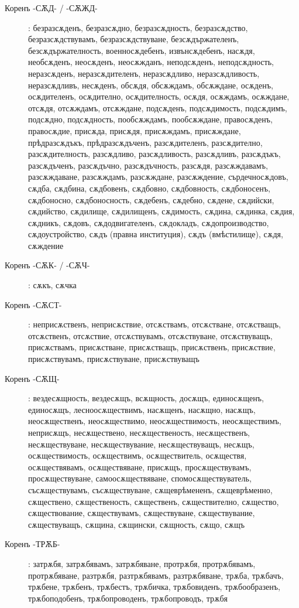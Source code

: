 \documentclass{article}
\begin{document}
\begin{description}
		\item[Коренъ -СѪД- / -СѪЖД-]: безразсѫденъ, безразсѫдно, безразсѫдность, безразсѫдство, безразсѫдствувамъ, безразсѫдствуване, безсѫдържателенъ, безсѫдържателность, военносѫдебенъ, извънсѫдебенъ, насѫдя, необсѫденъ, неосѫденъ, неосѫжданъ, неподсѫденъ, неподсѫдность, неразсѫденъ, неразсѫдителенъ, неразсѫдливо, неразсѫдливость, неразсѫдливъ, несѫденъ, обсѫдя, обсѫждамъ, обсѫждане, осѫденъ, осѫдителенъ, осѫдително, осѫдителность, осѫдя, осѫждамъ, осѫждане, отсѫдя, отсѫждамъ, отсѫждане, подсѫденъ, подсѫдимость, подсѫдимъ, подсѫдно, подсѫдность, пообсѫждамъ, пообсѫждане, правосѫденъ, правосѫдие, присѫда, присѫдя, присѫждамъ, присѫждане, прѣдразсѫдъкъ, прѣдразсѫдъченъ, разсѫдителенъ, разсѫдително, разсѫдителность, разсѫдливо, разсѫдливость, разсѫдливъ, разсѫдъкъ, разсѫдъченъ, разсѫдъчно, разсѫдъчность, разсѫдя, разсѫждавамъ, разсѫждаване, разсѫждамъ, разсѫждане, разсѫждение, сърдечносѫдовъ, сѫдба, сѫдбина, сѫдбовенъ, сѫдбовно, сѫдбовность, сѫдбоносенъ, сѫдбоносно, сѫдбоносность, сѫдебенъ, сѫдебно, сѫдене, сѫдийски, сѫдийство, сѫдилище, сѫдилищенъ, сѫдимость, сѫдина, сѫдинка, сѫдия, сѫдникъ, сѫдовъ, сѫдодвигателенъ, сѫдокладъ, сѫдопроизводство, сѫдоустройство, сѫдъ (правна институция), сѫдъ (вмѣстилище), сѫдя, сѫждение
		
		\item[Коренъ -СѪК- / -СѪЧ-]: сѫкъ, сѫчка
		
		\item[Коренъ -СѪСТ-]: неприсѫственъ, неприсѫствие, отсѫствамъ, отсѫстване, отсѫстващъ, отсѫственъ, отсѫствие, отсѫствувамъ, отсѫствуване, отсѫствуващъ, присѫствамъ, присѫстване, присѫстващъ, присѫственъ, присѫствие, присѫствувамъ, присѫствуване, присѫствуващъ
		
		\item[Коренъ -СѪЩ-]: вездесѫщность, вездесѫщъ, всѫщность, досѫщъ, единосѫщенъ, единосѫщъ, лесноосѫществимъ, насѫщенъ, насѫщно, насѫщъ, неосѫщественъ, неосѫществимо, неосѫществимость, неосѫществимъ, неприсѫщъ, несѫществено, несѫщественость, несѫщественъ, несѫществуване, несѫществувание, несѫществуващъ, несѫщъ, осѫществимость, осѫществимъ, осѫществитель, осѫществя, осѫществявамъ, осѫществяване, присѫщъ, просѫществувамъ, просѫществуване, самоосѫществяване, спомосѫществуватель, съсѫществувамъ, съсѫществуване, сѫщеврѣмененъ, сѫщеврѣменно, сѫществено, сѫщественость, сѫщественъ, сѫществително, сѫщество, сѫществование, сѫществувамъ, сѫществуване, сѫществувание, сѫществуващъ, сѫщина, сѫщински, сѫщность, сѫщо, сѫщъ
		
		\item[Коренъ -ТРѪБ-]: затрѫбя, затрѫбявамъ, затрѫбяване, протрѫбя, протрѫбявамъ, протрѫбяване, разтрѫбя, разтрѫбявамъ, разтрѫбяване, трѫба, трѫбачъ, трѫбене, трѫбенъ, трѫбестъ, трѫбичка, трѫбовиденъ, трѫбообразенъ, трѫбоподобенъ, трѫбопроводенъ, трѫбопроводъ, трѫбя
		

\end{description}
\end{document}

